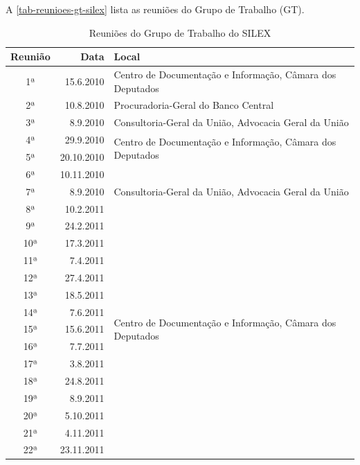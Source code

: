 \documentclass[a4paper,11pt,openright,twoside,brazil]{abntex2}
\begin{document}
A \autoref{tab-reunioes-gt-silex} lista as reuniões do Grupo de Trabalho (GT).

\begin{table}[htb]
\center
\footnotesize
\caption[Reuniões do Grupo de Trabalho do SILEX]{Reuniões do Grupo de Trabalho do SILEX}
\label{tab-reunioes-gt-silex}
\begin{tabular}{c|r|p{10.0cm}}
   \textbf{Reunião} & \textbf{Data} & \textbf{Local}   \\
    \hline
    1ª & 15.6.2010 & Centro de Documentação e Informação, Câmara dos Deputados
    \\ \hline
     2ª & 10.8.2010 & Procuradoria-Geral do Banco Central
    \\ \hline
    3ª & 8.9.2010 & Consultoria-Geral da União, Advocacia Geral da União
    \\ \hline
    4ª & 29.9.2010 & \multirow{2}{*}{Centro de Documentação e Informação,
    Câmara dos Deputados}
    \\ \cline{1-2}
    5ª & 20.10.2010 
    \\ \cline{1-2}
    6ª & 10.11.2010
    \\ \hline
    7ª & 8.9.2010 & Consultoria-Geral da União, Advocacia Geral da União
    \\ \hline
    8ª & 10.2.2011 & \multirow{26}{*}{Centro de Documentação e Informação,
    Câmara dos Deputados}
    \\ \cline{1-2}
    9ª & 24.2.2011
    \\ \cline{1-2}
    10ª & 17.3.2011
    \\ \cline{1-2}
    11ª & 7.4.2011
    \\ \cline{1-2}
    12ª & 27.4.2011
    \\ \cline{1-2}
    13ª & 18.5.2011
    \\ \cline{1-2}
    14ª & 7.6.2011
    \\ \cline{1-2}
    15ª & 15.6.2011
    \\ \cline{1-2}
    16ª & 7.7.2011
    \\ \cline{1-2}
    17ª & 3.8.2011
    \\ \cline{1-2}
    18ª & 24.8.2011
    \\ \cline{1-2}
    19ª & 8.9.2011
    \\ \cline{1-2}
    20ª & 5.10.2011
    \\ \cline{1-2}
    21ª & 4.11.2011
    \\ \cline{1-2}
    22ª & 23.11.2011
    \\ \cline{1-2}

\end{tabular}
\end{table}
\end{document}
